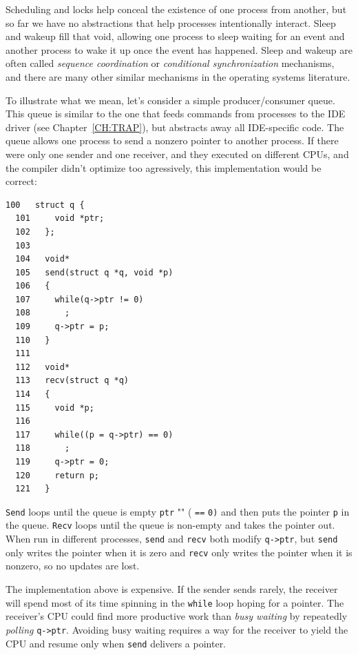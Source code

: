 Scheduling and locks help conceal the existence of one process
from another,
but so far we have no abstractions that help
processes intentionally interact.
Sleep and wakeup fill that void, allowing one process to 
sleep waiting for an event and another process to wake it up
once the event has happened.
Sleep and wakeup are often called 
\textit{sequence coordination}
or 
\textit{conditional synchronization}
mechanisms, and there are many other similar mechanisms
in the operating systems literature.

To illustrate what we mean, let's consider a
simple producer/consumer queue.
This queue is similar to the one that feeds commands from processes
to the IDE driver
(see Chapter~\ref{CH:TRAP}), but abstracts away all
IDE-specific code.
The queue allows one process to send a nonzero pointer
to another process.
If there were only one sender and one receiver,
and they executed on different CPUs,
and the compiler didn't optimize too agressively,
this implementation would be correct:
\begin{lstlisting}[]
  100	struct q {
  101	  void *ptr;
  102	};
  103	
  104	void*
  105	send(struct q *q, void *p)
  106	{
  107	  while(q->ptr != 0)
  108	    ;
  109	  q->ptr = p;
  110	}
  111	
  112	void*
  113	recv(struct q *q)
  114	{
  115	  void *p;
  116	
  117	  while((p = q->ptr) == 0)
  118	    ;
  119	  q->ptr = 0;
  120	  return p;
  121	}
\end{lstlisting}
\lstinline{Send}
loops until the queue is empty
\lstinline{ptr} "" (
\lstinline{==}
\lstinline{0)}
and then puts the pointer
\lstinline{p}
in the queue.
\lstinline{Recv}
loops until the queue is non-empty
and takes the pointer out.
When run in different processes,
\lstinline{send}
and
\lstinline{recv}
both modify
\lstinline{q->ptr},
but
\lstinline{send}
only writes the pointer when it is zero
and
\lstinline{recv}
only writes the pointer when it is nonzero,
so no updates are lost.

The implementation above 
is expensive.  If the sender sends
rarely, the receiver will spend most
of its time spinning in the 
\lstinline{while}
loop hoping for a pointer.
The receiver's CPU could find more productive work than
\textit{busy waiting}
by repeatedly 
\textit{polling}
\lstinline{q->ptr}.
Avoiding busy waiting requires
a way for the receiver to yield the CPU
and resume only when 
\lstinline{send}
delivers a pointer.


